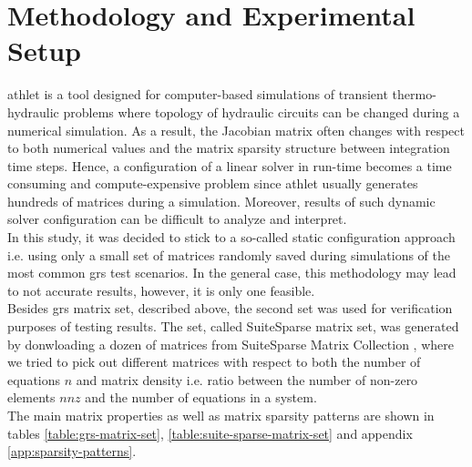 \chapter{Methodology and Experimental Setup}\label{subseq:matrix-sets-and-hardware}

\gls{athlet} is a tool designed for computer-based simulations of transient thermo-hydraulic problems where topology of hydraulic circuits can be changed during a numerical simulation. As a result, the Jacobian matrix often changes with respect to both numerical values and the matrix sparsity structure between integration time steps. Hence, a configuration of a linear solver in run-time becomes a time consuming and compute-expensive problem since \gls{athlet} usually generates hundreds of matrices during a simulation. Moreover, results of such dynamic solver configuration can be difficult to analyze and interpret.\\


In this study, it was decided to stick to a so-called static configuration approach i.e. using only a small set of matrices randomly saved during simulations of the most common \gls{grs} test scenarios. In the general case, this methodology may lead to not accurate results, however, it is only one feasible.\\


Besides \gls{grs} matrix set, described above, the second set was  used for verification purposes of testing results. The set, called SuiteSparse matrix set, was generated by donwloading a dozen of matrices from SuiteSparse Matrix Collection \cite{sparse-matrix-collection:1}, \cite{sparse-matrix-collection:2} where we tried to pick out different matrices with respect to both the number of equations $n$ and matrix density i.e. ratio between the number of non-zero elements $nnz$ and the number of equations in a system.\\ 


The main matrix properties as well as matrix sparsity patterns are shown in tables \ref{table:grs-matrix-set}, \ref{table:suite-sparse-matrix-set} and appendix \ref{app:sparsity-patterns}.\\


